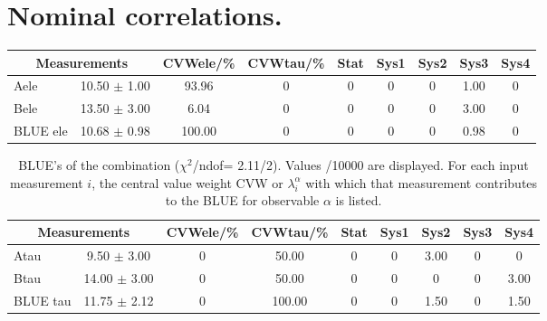 \section{Nominal correlations.}
\begin{table}[H]
\scriptsize
\begin{center}
\renewcommand{\arraystretch}{1.1}
\begin{tabular}{|lc|c|c|ccccc|}
\hline
\multicolumn{2}{|c|}{Measurements} & CVW{\tiny ele}/\%  & CVW{\tiny tau}/\%  & {\tiny Stat} & {\tiny Sys1} & {\tiny Sys2} & {\tiny Sys3} & {\tiny Sys4}\\
\hline
Aele &      10.50 $\pm$       1.00 &      93.96 &  0 &  0 &  0 &  0 &       1.00 &  0\\
Bele &      13.50 $\pm$       3.00 &       6.04 &  0 &  0 &  0 &  0 &       3.00 &  0\\
\hline
BLUE {\tiny ele} &      10.68 $\pm$       0.98 &     100.00 &  0 &  0 &  0 &  0 &       0.98 &  0\\
\hline
\end{tabular}
\renewcommand{\arraystretch}{1}
\end{center}
\end{table}
\vspace*{-0.5cm}
\begin{table}[H]
\scriptsize
\begin{center}
\renewcommand{\arraystretch}{1.1}
\begin{tabular}{|lc|c|c|ccccc|}
\hline
\multicolumn{2}{|c|}{Measurements} & CVW{\tiny ele}/\%  & CVW{\tiny tau}/\%  & {\tiny Stat} & {\tiny Sys1} & {\tiny Sys2} & {\tiny Sys3} & {\tiny Sys4}\\
\hline
Atau &       9.50 $\pm$       3.00 &  0 &      50.00 &  0 &  0 &       3.00 &  0 &  0\\
Btau &      14.00 $\pm$       3.00 &  0 &      50.00 &  0 &  0 &  0 &  0 &       3.00\\
\hline
BLUE {\tiny tau} &      11.75 $\pm$       2.12 &  0 &     100.00 &  0 &  0 &       1.50 &  0 &       1.50\\
\hline
\end{tabular}
\caption{BLUE's of the combination ($\chi^2$/ndof=      2.11/2).
 Values /10000 are displayed. For each input measurement $i$, the central value weight CVW or $\lambda_i^\alpha$ with which that measurement contributes to the BLUE for observable $\alpha$ is listed.}
\renewcommand{\arraystretch}{1}
\end{center}
\end{table}
